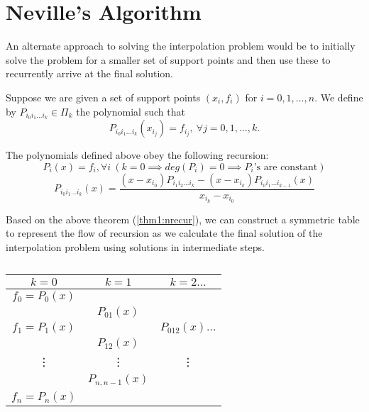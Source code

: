 
\section{Neville's Algorithm}

An alternate approach to solving the interpolation problem would be to initially solve the problem for a smaller set of support points and then use these to recurrently arrive at the final solution.\\
\begin{defn}\label{def1:npoly} 
Suppose we are given a set of support points $(x_i, f_i)$ for  $i=0,1, \ldots , n$. We define by $P_{i_0i_1\ldots i_k} \in \Pi _k$ the polynomial such that 
 \[
     P_{i_0i_1\ldots i_k}(x_{i_j}) = f_{i_j}, \  \forall j=0,1,\ldots,k
.\] 
\end{defn}
\begin{thm}\label{thm1:nrecur}
   The polynomials defined above obey the following recursion:
   \begin{equation}\label{eq1:l21}
      P_i(x) = f_i, \forall i \  (k=0 \implies deg(P_i)=0 \implies P_i\text{'s are constant})
   \end{equation}
   \begin{equation}\label{eq2:l21}
       P_{i_0i_1\ldots i_k}(x) = \frac{(x-x_{i_0})P_{i_1i_2\ldots i_k} - (x-x_{i_k})P_{i_0i_1\ldots i_{k-1}}(x)}{x_{i_k} - x_{i_0}}
   \end{equation}
\end{thm}

Based on the above theorem (\ref{thm1:nrecur}), we can construct a symmetric table to represent the flow of recursion as we calculate the final solution of the interpolation problem using solutions in intermediate steps.

\begin{table}
   \centering
   \caption{}
   \label{tab1:lec21}
   \begin{tabular}{|c|c|c}
      \hline
      $k=0$ & $k=1$ & $k=2 \hdots$ \\
      \hline
      $ f_0 = P_0(x)$ & & \\
         & $P_{01}(x)$ & \\
      $f_1 = P_1(x)$ & & $P_{012}(x) \hdots$ \\
                     & $P_{12}(x)$ & \\
      \vdots & \vdots & \vdots \\
             & $P_{n,n-1}(x)$ & \\
      $f_n = P_n(x)$ & &   \\
      \hline
   \end{tabular}
\end{table}


